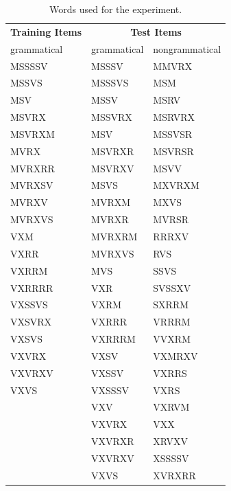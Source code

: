 \begin{table}[H]
\centering
\begin{tabular}{p{3.5cm} p{3.5cm} p{3.5cm}}
\toprule
\textbf{Training Items} & \multicolumn{2}{c}{\textbf{Test Items}}\\
\cmidrule(lr{.75em}){1-1}\cmidrule(lr{.75em}){2-3}
grammatical & grammatical & nongrammatical \\
\cmidrule(lr{.75em}){1-1}\cmidrule(lr{.75em}){2-3}
MSSSSV & MSSSV & MMVRX \\
MSSVS & MSSSVS & MSM \\
MSV & MSSV & MSRV \\
MSVRX & MSSVRX & MSRVRX \\ 
MSVRXM & MSV & MSSVSR \\
MVRX & MSVRXR & MSVRSR \\
MVRXRR & MSVRXV & MSVV \\
MVRXSV & MSVS & MXVRXM \\
MVRXV & MVRXM & MXVS \\
MVRXVS & MVRXR & MVRSR \\
VXM & MVRXRM & RRRXV \\
VXRR & MVRXVS & RVS \\
VXRRM & MVS & SSVS \\
VXRRRR & VXR & SVSSXV \\
VXSSVS & VXRM & SXRRM \\
VXSVRX & VXRRR & VRRRM \\
VXSVS & VXRRRM & VVXRM \\
VXVRX & VXSV & VXMRXV \\
VXVRXV & VXSSV & VXRRS \\
VXVS & VXSSSV & VXRS \\
          & VXV & VXRVM \\
         & VXVRX & VXX \\
          & VXVRXR & XRVXV \\
            & VXVRXV & XSSSSV \\
            & VXVS & XVRXRR \\
\bottomrule
\end{tabular}
\caption{Words used for the experiment.}
\label{tab:stimuli}
\end{table}


